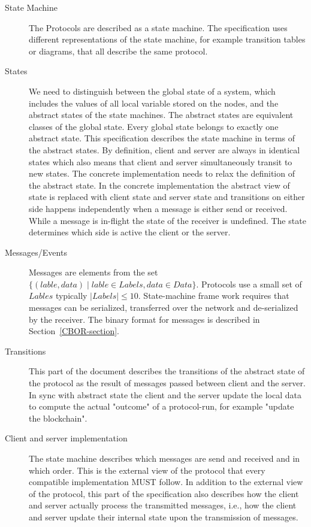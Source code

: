 \documentclass{report}
\newcommand{\wip}[1]{\color{magenta}{#1}\color{black}}
\theoremstyle{definition}{
  \newtheorem{lemma}{Lemma}[section] %
  \newtheorem{definition}[lemma]{Definition}
}
\theoremstyle{theorem}{
  \newtheorem{invariant}[lemma]{Invariant}
  \newtheorem{proofobligation}[lemma]{Proof Obligation}
}
\numberwithin{equation}{lemma}
\begin{document}
\begin{description}
\item[State Machine]
  The Protocols are described as a state machine.
  The specification uses different representations of the state machine,
  for example transition tables or diagrams, that all describe the same protocol.

\item[States]
  We need to distinguish between the global state of a system,
  which includes the values of all local variable stored on the nodes,
  and the abstract states of the state machines.
  The abstract states are equivalent classes of the global state.
  Every global state belongs to exactly one abstract state.
  This specification describes the state machine in terms of the abstract states.
  By definition, client and server are always in identical states
  which also means that client and server simultaneously transit to new states.
  The concrete implementation needs to relax the definition of the abstract state.
  In the concrete implementation the abstract view of state is replaced with
  client state and server state and transitions on either side happens independently
  when a message is either send or received.
  While a message is in-flight the state of the receiver is undefined.
  The state determines which side is active the client or the server.
  
\item[Messages/Events]
  Messages are elements from the set
  $\{(lable, data) \mid lable \in Labels, data \in Data\}$.
  Protocols use a small set of $Lables$ typically $|Labels| \leq 10$.
  State-machine frame work requires that messages can be serialized,
  transferred over the network and de-serialized by the receiver.
  The binary format for messages is described in Section~\ref{CBOR-section}.

\item[Transitions]
  This part of the document describes the transitions of the abstract state of the protocol
  as the result of messages passed between client and the server.
  In sync with abstract state the client and the server update the local data
  to compute the actual "outcome" of a protocol-run, for example "update the
  blockchain".
  \wip{WIP: there are also hard contraints on the transitions, e.g. transaction is valid,etc}

\item[Client and server implementation]
  The state machine describes which messages are send and received and in which order.
  This is the external view of the protocol that every compatible implementation MUST follow.
  In addition to the external view of the protocol, this part of the specification also describes
  how the client and server actually process the transmitted messages,
  i.e., how the client and server update their internal state upon the transmission of messages.


\end{description}
\end{document}
